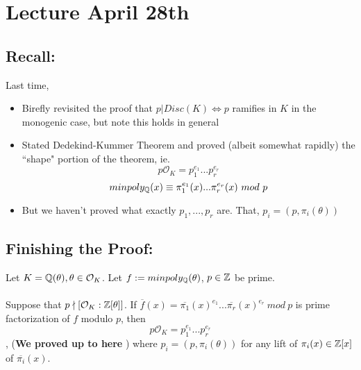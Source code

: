 \section{Lecture April 28th}

\subsection{Recall:}

Last time,

\begin{itemize}
    \item Birefly revisited the proof that $p | Disc(K) \iff p$ ramifies in $K$ in the monogenic case, but note this holds in general
    \item Stated Dedekind-Kummer Theorem and proved (albeit somewhat rapidly) the ``shape" portion of the theorem, ie. 
    \[p\mathcal{O}_K = p_1^{e_1} ... p_r^{e_r}\]
    \[minpoly_{\mathbb{Q}}(x) \equiv \pi_1^{e_1}(x) ... \pi_r^{e_r}(x)\ mod\ p\]
    \item But we haven't proved what exactly $p_1, ..., p_r$ are. That, $p_i = (p, \pi_i(\theta))$
\end{itemize}

\subsection{Finishing the Proof:}

\begin{theorem}
Let $K = \mathbb{Q}(\theta), \theta \in \mathcal{O}_K$. Let $f := minpoly_{\mathbb{Q}}(\theta)$, $p \in \mathbb{Z}$ be prime.\\\\
Suppose that $p \nmid [\mathcal{O}_K : \mathbb{Z}[\theta]]$. If $\overline{f}(x) = \overline{\pi_1}(x)^{e_1} ... \overline{\pi_r}(x)^{e_r}\ mod\ p$ is prime factorization of $f$ modulo $p$, then
\[p\mathcal{O}_K = p_1^{e_1} ... p_r^{e_r}\]
, ({\bf We proved up to here }) where $p_i = (p, \pi_i(\theta))$ for any lift of $\pi_i(x) \in \mathbb{Z}[x]$ of $\overline{\pi_i}(x)$.
\end{theorem}

